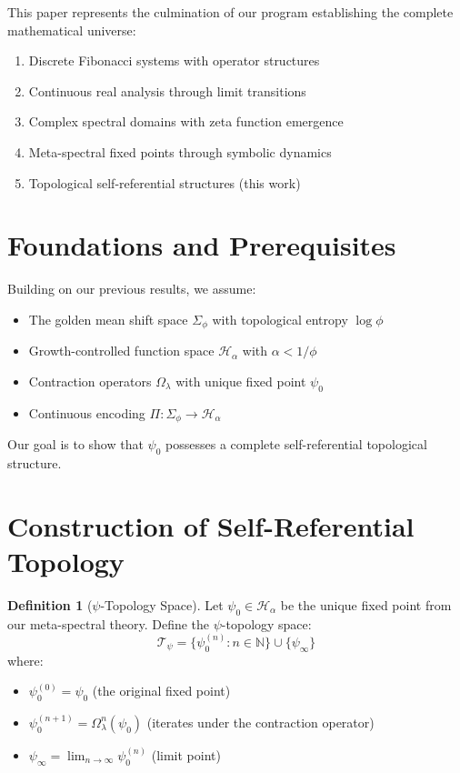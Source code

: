 \documentclass[12pt]{article}
\theoremstyle{plain}
\theoremstyle{definition}
\newtheorem{definition}[theorem]{Definition}
\begin{document}
This paper represents the culmination of our program establishing the complete mathematical universe:
\begin{enumerate}
\item Discrete Fibonacci systems with operator structures
\item Continuous real analysis through limit transitions
\item Complex spectral domains with zeta function emergence
\item Meta-spectral fixed points through symbolic dynamics
\item Topological self-referential structures (this work)
\end{enumerate}

\section{Foundations and Prerequisites}

Building on our previous results, we assume:
\begin{itemize}
\item The golden mean shift space $\Sigma_\phi$ with topological entropy $\log \phi$
\item Growth-controlled function space $\mathcal{H}_\alpha$ with $\alpha < 1/\phi$
\item Contraction operators $\Omega_\lambda$ with unique fixed point $\psi_0$
\item Continuous encoding $\Pi: \Sigma_\phi \to \mathcal{H}_\alpha$
\end{itemize}

Our goal is to show that $\psi_0$ possesses a complete self-referential topological structure.

\section{Construction of Self-Referential Topology}

\begin{definition}[$\psi$-Topology Space]
Let $\psi_0 \in \mathcal{H}_\alpha$ be the unique fixed point from our meta-spectral theory. Define the $\psi$-topology space:
$$\mathcal{T}_\psi = \{\psi_0^{(n)} : n \in \mathbb{N}\} \cup \{\psi_\infty\}$$
where:
\begin{itemize}
\item $\psi_0^{(0)} = \psi_0$ (the original fixed point)
\item $\psi_0^{(n+1)} = \Omega_\lambda^n(\psi_0)$ (iterates under the contraction operator)
\item $\psi_\infty = \lim_{n \to \infty} \psi_0^{(n)}$ (limit point)
\end{itemize}
\end{definition}
\end{document}
